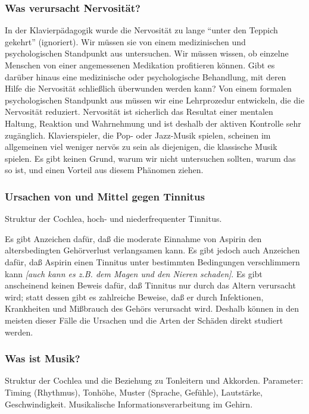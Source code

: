 \subsubsection{Was verursacht Nervosität?}
\label{c1iv6d}

In der Klavierpädagogik wurde die Nervosität zu lange \enquote{unter den Teppich gekehrt} (ignoriert).
Wir müssen sie von einem medizinischen und psychologischen Standpunkt aus untersuchen.
Wir müssen wissen, ob einzelne Menschen von einer angemessenen Medikation profitieren können.
Gibt es darüber hinaus eine medizinische oder psychologische Behandlung, mit deren Hilfe die Nervosität schließlich überwunden werden kann?
Von einem formalen psychologischen Standpunkt aus müssen wir eine Lehrprozedur entwickeln, die die Nervosität reduziert.
Nervosität ist sicherlich das Resultat einer mentalen Haltung, Reaktion und Wahrnehmung und ist deshalb der aktiven Kontrolle sehr zugänglich.
Klavierspieler, die Pop- oder Jazz-Musik spielen, scheinen im allgemeinen viel weniger nervös zu sein als diejenigen, die klassische Musik spielen.
Es gibt keinen Grund, warum wir nicht untersuchen sollten, warum das so ist, und einen Vorteil aus diesem Phänomen ziehen.


\subsubsection{Ursachen von und Mittel gegen Tinnitus}
\label{c1iv6e}

Struktur der Cochlea, hoch- und niederfrequenter Tinnitus.

Es gibt Anzeichen dafür, daß die moderate Einnahme von Aspirin den altersbedingten Gehörverlust verlangsamen kann.
Es gibt jedoch auch Anzeichen dafür, daß Aspirin einen Tinnitus unter bestimmten Bedingungen verschlimmern kann \textit{[auch kann es z.B. dem Magen und den Nieren schaden]}.
Es gibt anscheinend keinen Beweis dafür, daß Tinnitus nur durch das Altern verursacht wird; statt dessen gibt es zahlreiche Beweise, daß er durch Infektionen, Krankheiten und Mißbrauch des Gehörs verursacht wird.
Deshalb können in den meisten dieser Fälle die Ursachen und die Arten der Schäden direkt studiert werden.


\subsubsection{Was ist Musik?}
\label{c1iv6f}

Struktur der Cochlea und die Beziehung zu Tonleitern und Akkorden.
Parameter: Timing (Rhythmus), Tonhöhe, Muster (Sprache, Gefühle), Lautstärke, Geschwindigkeit.
Musikalische Informationsverarbeitung im Gehirn.


